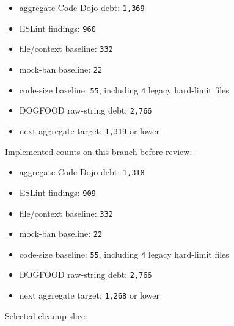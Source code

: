 \begin{itemize}
\tightlist
\item
  aggregate Code Dojo debt: \texttt{1\allowbreak{},\allowbreak{}3\allowbreak{}6\allowbreak{}9}
\item
  ESLint findings: \texttt{9\allowbreak{}6\allowbreak{}0}
\item
  file/context baseline: \texttt{3\allowbreak{}3\allowbreak{}2}
\item
  mock-ban baseline: \texttt{2\allowbreak{}2}
\item
  code-size baseline: \texttt{5\allowbreak{}5}, including \texttt{4} legacy hard-limit files
\item
  DOGFOOD raw-string debt: \texttt{2\allowbreak{},\allowbreak{}7\allowbreak{}6\allowbreak{}6}
\item
  next aggregate target: \texttt{1\allowbreak{},\allowbreak{}3\allowbreak{}1\allowbreak{}9} or lower
\end{itemize}

Implemented counts on this branch before review:

\begin{itemize}
\tightlist
\item
  aggregate Code Dojo debt: \texttt{1\allowbreak{},\allowbreak{}3\allowbreak{}1\allowbreak{}8}
\item
  ESLint findings: \texttt{9\allowbreak{}0\allowbreak{}9}
\item
  file/context baseline: \texttt{3\allowbreak{}3\allowbreak{}2}
\item
  mock-ban baseline: \texttt{2\allowbreak{}2}
\item
  code-size baseline: \texttt{5\allowbreak{}5}, including \texttt{4} legacy hard-limit files
\item
  DOGFOOD raw-string debt: \texttt{2\allowbreak{},\allowbreak{}7\allowbreak{}6\allowbreak{}6}
\item
  next aggregate target: \texttt{1\allowbreak{},\allowbreak{}2\allowbreak{}6\allowbreak{}8} or lower
\end{itemize}

Selected cleanup slice:


